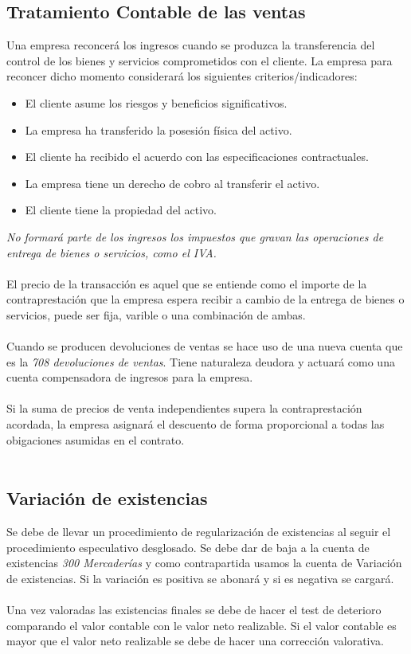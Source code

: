 \documentclass[a4paper,12pt]{article}
\begin{document}
\subsection{Tratamiento Contable de las ventas}

Una empresa reconcerá los ingresos cuando se produzca la transferencia del control de los bienes y servicios comprometidos con el cliente. La empresa para reconcer dicho momento considerará los siguientes criterios/indicadores:
\begin{itemize}
    \item El cliente asume los riesgos y beneficios significativos.
    \item La empresa ha transferido la posesión física del activo.
    \item El cliente ha recibido el acuerdo con las especificaciones contractuales.
    \item La empresa tiene un derecho de cobro al transferir el activo.
    \item El cliente tiene la propiedad del activo.
\end{itemize}

\textit{No formará parte de los ingresos los impuestos que gravan las operaciones de entrega de bienes o servicios, como el IVA.}\\\\
El precio de la transacción es aquel que se entiende como el importe de la contraprestación que la empresa espera recibir a cambio de la entrega de bienes o servicios, puede ser fija, varible o una combinación de ambas.\\\\
Cuando se producen devoluciones de ventas se hace uso de una nueva cuenta que es la \textit{708 devoluciones de ventas}. Tiene naturaleza deudora y actuará como una cuenta compensadora de ingresos para la empresa.\\\\
Si la suma de precios de venta independientes supera la contraprestación acordada, la empresa asignará el descuento de forma proporcional a todas las obigaciones asumidas en el contrato.\\\\

\subsection{Variación de existencias}

Se debe de llevar un procedimiento de regularización de existencias al seguir el procedimiento especulativo desglosado. Se debe dar de baja a la cuenta de existencias \textit{300 Mercaderías} y como contrapartida usamos la cuenta de Variación de existencias. Si la variación es positiva se abonará y si es negativa se cargará.\\\\ 
Una vez valoradas las existencias finales se debe de hacer el test de deterioro comparando el valor contable con le valor neto realizable. Si el valor contable es mayor que el valor neto realizable se debe de hacer una corrección valorativa.\\\\
\end{document}
